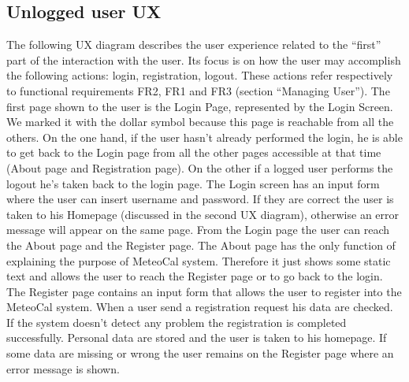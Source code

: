 \documentclass[10pt,a4paper,titlepage]{article}
\begin{document}
\subsection{Unlogged user UX}
The following UX diagram describes the user experience related to the “first” part of the interaction with the user. Its focus is on how the user may accomplish the following actions: login, registration, logout. These actions refer respectively to functional requirements FR2, FR1 and FR3 (section “Managing User”).
The first page shown to the user is the Login Page, represented by the Login Screen. We marked it with the dollar symbol because this page is reachable from all the others. On the one hand, if the user hasn’t already performed the login, he is able to get back to the Login page from all the other pages accessible at that time (About page and Registration page). On the other if a logged user performs the logout he’s taken back to the login page. 
The Login screen has an input form where the user can insert username and password. If they are correct the user is taken to his Homepage (discussed in the second UX diagram), otherwise an error message will appear on the same page. From the Login page the user can reach the About page and the Register page.
The About page has the only function of explaining the purpose of MeteoCal system. Therefore it just shows some static text and allows the user to reach the Register page or to go back to the login.
The Register page contains an input form that allows the user to register into the MeteoCal system. When a user send a registration request his data are checked. If the system doesn’t detect any problem the registration is completed successfully. Personal data are stored and the user is taken to his homepage. If some data are missing or wrong the user remains on the Register page where an error message is shown.
\end{document}
